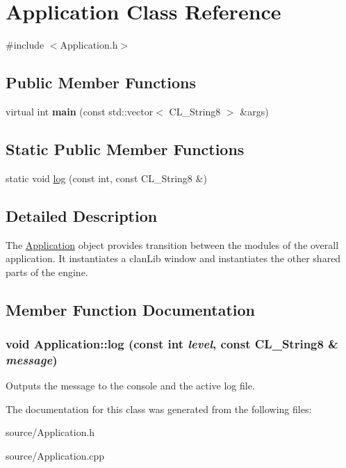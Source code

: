 \hypertarget{classApplication}{
\section{Application Class Reference}
\label{classApplication}
}


{\ttfamily \#include $<$Application.h$>$}

\subsection*{Public Member Functions}
\begin{DoxyCompactItemize}
\item 
\hypertarget{classApplication_ace6c0b40549bebaebb333c3c5d328b9c}{
virtual int {\bfseries main} (const std::vector$<$ CL\_\-String8 $>$ \&args)}
\label{classApplication_ace6c0b40549bebaebb333c3c5d328b9c}

\end{DoxyCompactItemize}
\subsection*{Static Public Member Functions}
\begin{DoxyCompactItemize}
\item 
static void \hyperlink{classApplication_a0a24cbfb580f7338139f449d367e3483}{log} (const int, const CL\_\-String8 \&)
\end{DoxyCompactItemize}


\subsection{Detailed Description}
The \hyperlink{classApplication}{Application} object provides transition between the modules of the overall application. It instantiates a clanLib window and instantiates the other shared parts of the engine. 

\subsection{Member Function Documentation}
\hypertarget{classApplication_a0a24cbfb580f7338139f449d367e3483}{
\subsubsection[{log}]{\setlength{\rightskip}{0pt plus 5cm}void Application::log (const int {\em level}, \/  const CL\_\-String8 \& {\em message})}}
\label{classApplication_a0a24cbfb580f7338139f449d367e3483}
Outputs the message to the console and the active log file. 

The documentation for this class was generated from the following files:\begin{DoxyCompactItemize}
\item 
source/Application.h\item 
source/Application.cpp\end{DoxyCompactItemize}
